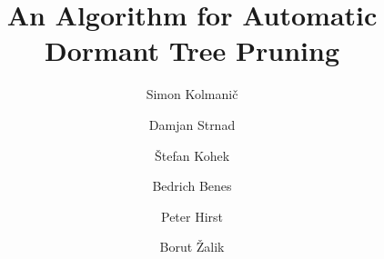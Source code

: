 \documentclass[1p]{elsarticle}
\date{}
\begin{document}
\begin{frontmatter}


\title{An Algorithm for Automatic Dormant Tree Pruning }

\author[FERI]{Simon Kolmani\v{c}}
\author[FERI]{Damjan Strnad}
\author[FERI]{\v{S}tefan Kohek}
\author[PURDUE]{Bedrich Benes}
\author[PURDUE]{Peter Hirst}
\author[FERI]{Borut \v{Z}alik}

\address[FERI]{%
University of Maribor, Koroška cesta 46, 2000 Maribor, Slovenia}
\address[PURDUE]{Purdue University West Lafayette, IN 47906, USA}







\end{frontmatter}










\end{document}
